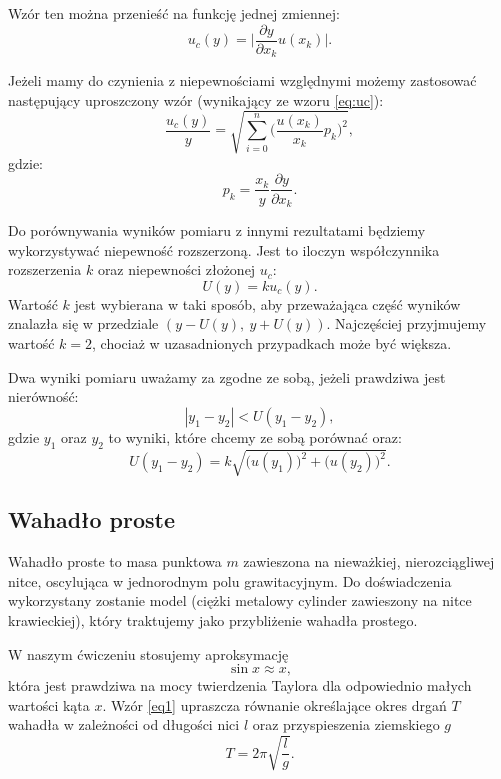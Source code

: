 \documentclass[12pt,a4paper]{article}
\numberwithin{equation}{section}
\begin{document}
Wzór ten można przenieść na funkcję jednej zmiennej:
\begin{equation}
	u_c(y) = \Bigg|\frac{\partial y}{\partial x_k}u(x_k)\Bigg|.
	\label{eq:uc_single}
\end{equation}

Jeżeli mamy do czynienia z niepewnościami względnymi możemy zastosować następujący uproszczony wzór (wynikający ze wzoru \ref{eq:uc}):
\begin{equation}
	\frac{u_c(y)}{y} = \sqrt{\sum_{i=0}^{n}\Bigg(\frac{u(x_k)}{x_k}p_k\Bigg)^2},
\end{equation}
gdzie:
\begin{equation}
	p_k = \frac{x_k}{y} \frac{\partial y}{\partial x_k}.
\end{equation}

Do porównywania wyników pomiaru z innymi rezultatami będziemy wykorzystywać niepewność rozszerzoną. Jest to iloczyn współczynnika rozszerzenia $k$ oraz niepewności złożonej $u_c$:
\begin{equation}
	U(y) = k u_c(y).
	\label{eq:uc_exp}
\end{equation}
Wartość $k$ jest wybierana w taki sposób, aby przeważająca część wyników znalazła się w przedziale $(y - U(y),~y + U(y))$. Najczęściej przyjmujemy wartość $k = 2$, chociaż w uzasadnionych przypadkach może być większa.

Dwa wyniki pomiaru uważamy za zgodne ze sobą, jeżeli prawdziwa jest nierówność:
\begin{equation}
	|y_1 - y_2| < U(y_1 - y_2),
\end{equation}
gdzie $y_1$ oraz $y_2$ to wyniki, które chcemy ze sobą porównać oraz:
\begin{equation}
	U(y_1 - y_2) = k\sqrt{\Big(u(y_1)\Big)^2 + \Big(u(y_2)\Big)^2}.
\end{equation}

\subsection{Wahadło proste}

Wahadło proste to masa punktowa $m$ zawieszona na nieważkiej, nierozciągliwej nitce, oscylująca w jednorodnym polu grawitacyjnym. Do doświadczenia wykorzystany zostanie model (ciężki metalowy cylinder zawieszony na nitce krawieckiej), który traktujemy jako przybliżenie wahadła prostego.

W naszym ćwiczeniu stosujemy aproksymację
\begin{equation}
	\label{eq1}
	\sin x \approx x,
\end{equation}
która jest prawdziwa na mocy twierdzenia Taylora dla odpowiednio małych wartości kąta $x$. Wzór \ref{eq1} upraszcza równanie określające okres drgań $T$ wahadła w zależności od długości nici $l$ oraz przyspieszenia ziemskiego $g$
\begin{equation}
	\label{eq2}
	T = 2\pi\sqrt{\frac{l}{g}}.
\end{equation}
\end{document}
